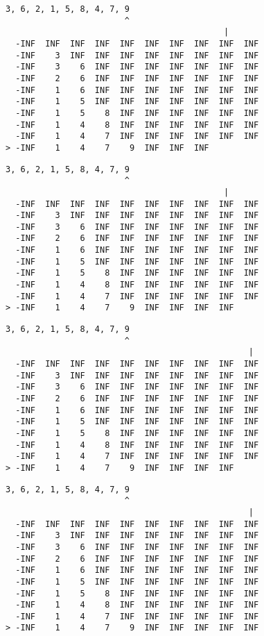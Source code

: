 { \begin{verbatim}
3, 6, 2, 1, 5, 8, 4, 7, 9
                        ^
                                            |
  -INF  INF  INF  INF  INF  INF  INF  INF  INF  INF
  -INF    3  INF  INF  INF  INF  INF  INF  INF  INF
  -INF    3    6  INF  INF  INF  INF  INF  INF  INF
  -INF    2    6  INF  INF  INF  INF  INF  INF  INF
  -INF    1    6  INF  INF  INF  INF  INF  INF  INF
  -INF    1    5  INF  INF  INF  INF  INF  INF  INF
  -INF    1    5    8  INF  INF  INF  INF  INF  INF
  -INF    1    4    8  INF  INF  INF  INF  INF  INF
  -INF    1    4    7  INF  INF  INF  INF  INF  INF
> -INF    1    4    7    9  INF  INF  INF          
\end{verbatim} }

{ \begin{verbatim}
3, 6, 2, 1, 5, 8, 4, 7, 9
                        ^
                                            |
  -INF  INF  INF  INF  INF  INF  INF  INF  INF  INF
  -INF    3  INF  INF  INF  INF  INF  INF  INF  INF
  -INF    3    6  INF  INF  INF  INF  INF  INF  INF
  -INF    2    6  INF  INF  INF  INF  INF  INF  INF
  -INF    1    6  INF  INF  INF  INF  INF  INF  INF
  -INF    1    5  INF  INF  INF  INF  INF  INF  INF
  -INF    1    5    8  INF  INF  INF  INF  INF  INF
  -INF    1    4    8  INF  INF  INF  INF  INF  INF
  -INF    1    4    7  INF  INF  INF  INF  INF  INF
> -INF    1    4    7    9  INF  INF  INF  INF     
\end{verbatim} }

{ \begin{verbatim}
3, 6, 2, 1, 5, 8, 4, 7, 9
                        ^
                                                 |
  -INF  INF  INF  INF  INF  INF  INF  INF  INF  INF
  -INF    3  INF  INF  INF  INF  INF  INF  INF  INF
  -INF    3    6  INF  INF  INF  INF  INF  INF  INF
  -INF    2    6  INF  INF  INF  INF  INF  INF  INF
  -INF    1    6  INF  INF  INF  INF  INF  INF  INF
  -INF    1    5  INF  INF  INF  INF  INF  INF  INF
  -INF    1    5    8  INF  INF  INF  INF  INF  INF
  -INF    1    4    8  INF  INF  INF  INF  INF  INF
  -INF    1    4    7  INF  INF  INF  INF  INF  INF
> -INF    1    4    7    9  INF  INF  INF  INF     
\end{verbatim} }

{ \begin{verbatim}
3, 6, 2, 1, 5, 8, 4, 7, 9
                        ^
                                                 |
  -INF  INF  INF  INF  INF  INF  INF  INF  INF  INF
  -INF    3  INF  INF  INF  INF  INF  INF  INF  INF
  -INF    3    6  INF  INF  INF  INF  INF  INF  INF
  -INF    2    6  INF  INF  INF  INF  INF  INF  INF
  -INF    1    6  INF  INF  INF  INF  INF  INF  INF
  -INF    1    5  INF  INF  INF  INF  INF  INF  INF
  -INF    1    5    8  INF  INF  INF  INF  INF  INF
  -INF    1    4    8  INF  INF  INF  INF  INF  INF
  -INF    1    4    7  INF  INF  INF  INF  INF  INF
> -INF    1    4    7    9  INF  INF  INF  INF  INF
\end{verbatim} }

